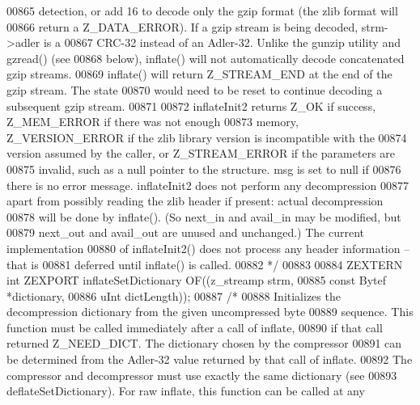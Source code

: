 \begin{DoxyCode}
00865 \textcolor{comment}{   detection, or add 16 to decode only the gzip format (the zlib format will}
00866 \textcolor{comment}{   return a Z\_DATA\_ERROR).  If a gzip stream is being decoded, strm->adler is a}
00867 \textcolor{comment}{   CRC-32 instead of an Adler-32.  Unlike the gunzip utility and gzread() (see}
00868 \textcolor{comment}{   below), inflate() will not automatically decode concatenated gzip streams.}
00869 \textcolor{comment}{   inflate() will return Z\_STREAM\_END at the end of the gzip stream.  The state}
00870 \textcolor{comment}{   would need to be reset to continue decoding a subsequent gzip stream.}
00871 \textcolor{comment}{}
00872 \textcolor{comment}{     inflateInit2 returns Z\_OK if success, Z\_MEM\_ERROR if there was not enough}
00873 \textcolor{comment}{   memory, Z\_VERSION\_ERROR if the zlib library version is incompatible with the}
00874 \textcolor{comment}{   version assumed by the caller, or Z\_STREAM\_ERROR if the parameters are}
00875 \textcolor{comment}{   invalid, such as a null pointer to the structure.  msg is set to null if}
00876 \textcolor{comment}{   there is no error message.  inflateInit2 does not perform any decompression}
00877 \textcolor{comment}{   apart from possibly reading the zlib header if present: actual decompression}
00878 \textcolor{comment}{   will be done by inflate().  (So next\_in and avail\_in may be modified, but}
00879 \textcolor{comment}{   next\_out and avail\_out are unused and unchanged.) The current implementation}
00880 \textcolor{comment}{   of inflateInit2() does not process any header information -- that is}
00881 \textcolor{comment}{   deferred until inflate() is called.}
00882 \textcolor{comment}{*/}
00883 
00884 ZEXTERN \textcolor{keywordtype}{int} ZEXPORT inflateSetDictionary OF((z\_streamp strm,
00885                                              \textcolor{keyword}{const} Bytef *dictionary,
00886                                              uInt  dictLength));
00887 \textcolor{comment}{/*}
00888 \textcolor{comment}{     Initializes the decompression dictionary from the given uncompressed byte}
00889 \textcolor{comment}{   sequence.  This function must be called immediately after a call of inflate,}
00890 \textcolor{comment}{   if that call returned Z\_NEED\_DICT.  The dictionary chosen by the compressor}
00891 \textcolor{comment}{   can be determined from the Adler-32 value returned by that call of inflate.}
00892 \textcolor{comment}{   The compressor and decompressor must use exactly the same dictionary (see}
00893 \textcolor{comment}{   deflateSetDictionary).  For raw inflate, this function can be called at any}

\end{DoxyCode}
